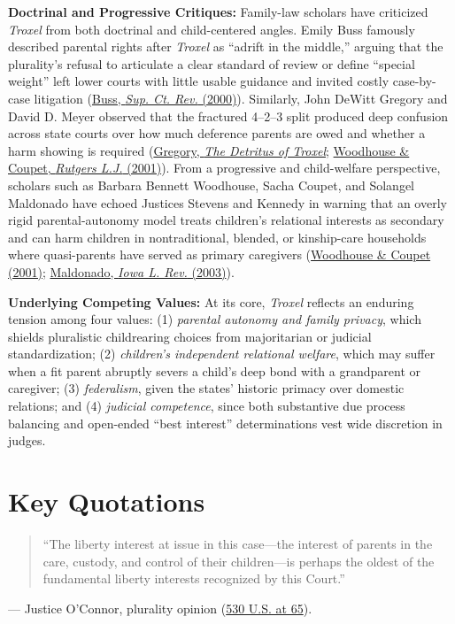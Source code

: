 \documentclass[12pt]{article}
\begin{document}
\textbf{Doctrinal and Progressive Critiques:} Family-law scholars have criticized \textit{Troxel} from both doctrinal and child-centered angles. Emily Buss famously described parental rights after \textit{Troxel} as ``adrift in the middle,'' arguing that the plurality's refusal to articulate a clear standard of review or define ``special weight'' left lower courts with little usable guidance and invited costly case-by-case litigation (\href{https://chicagounbound.uchicago.edu/supremecourtrev/vol2000/iss1/7/}{Buss, \textit{Sup. Ct. Rev.} (2000)}). Similarly, John DeWitt Gregory and David D. Meyer observed that the fractured 4--2--3 split produced deep confusion across state courts over how much deference parents are owed and whether a harm showing is required (\href{https://scholarlycommons.law.hofstra.edu/cgi/viewcontent.cgi?referer=&httpsredir=1&article=1144&context=faculty_scholarship}{Gregory, \textit{The Detritus of Troxel}}; \href{https://lawecommons.luc.edu/cgi/viewcontent.cgi?referer=&httpsredir=1&article=1283&context=facpubs}{Woodhouse \& Coupet, \textit{Rutgers L.J.} (2001)}). From a progressive and child-welfare perspective, scholars such as Barbara Bennett Woodhouse, Sacha Coupet, and Solangel Maldonado have echoed Justices Stevens and Kennedy in warning that an overly rigid parental-autonomy model treats children's relational interests as secondary and can harm children in nontraditional, blended, or kinship-care households where quasi-parents have served as primary caregivers (\href{https://lawecommons.luc.edu/cgi/viewcontent.cgi?referer=&httpsredir=1&article=1283&context=facpubs}{Woodhouse \& Coupet (2001)}; \href{https://www.semanticscholar.org/paper/When-Father-(or-Mother)-Doesn\%27t-Know-Best\%3A-and-V.-Maldonado/850aa01eb77f26db562bdf0358f9a455385dfa6e}{Maldonado, \textit{Iowa L. Rev.} (2003)}).

\textbf{Underlying Competing Values:} At its core, \textit{Troxel} reflects an enduring tension among four values: (1) \textit{parental autonomy and family privacy}, which shields pluralistic childrearing choices from majoritarian or judicial standardization; (2) \textit{children's independent relational welfare}, which may suffer when a fit parent abruptly severs a child's deep bond with a grandparent or caregiver; (3) \textit{federalism}, given the states' historic primacy over domestic relations; and (4) \textit{judicial competence}, since both substantive due process balancing and open-ended ``best interest'' determinations vest wide discretion in judges.

\section{Key Quotations}
\begin{quote}
``The liberty interest at issue in this case---the interest of parents in the care, custody, and control of their children---is perhaps the oldest of the fundamental liberty interests recognized by this Court.''
\end{quote}
\noindent --- Justice O'Connor, plurality opinion (\href{https://www.law.cornell.edu/supremecourt/text/99-138}{530 U.S. at 65}).
\end{document}
